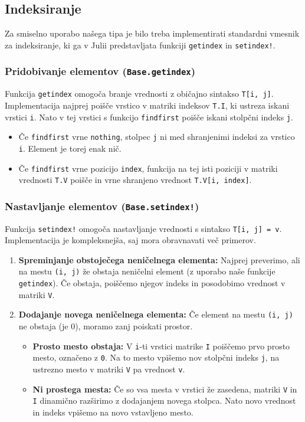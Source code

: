 \documentclass{article}
\begin{document}
\subsection{Indeksiranje}
Za smiselno uporabo našega tipa je bilo treba implementirati standardni 
vmesnik za indeksiranje, ki ga v Julii predstavljata funkciji \texttt{getindex} 
in \texttt{setindex!}.

\subsubsection{Pridobivanje elementov (\texttt{Base.getindex})}

Funkcija \texttt{getindex} omogoča branje vrednosti z običajno sintakso 
\texttt{T[i, j]}. Implementacija najprej poišče vrstico v matriki indeksov 
\texttt{T.I}, ki ustreza iskani vrstici \texttt{i}. Nato v tej vrstici s 
funkcijo \texttt{findfirst} poišče iskani stolpčni indeks \texttt{j}.

\begin{itemize}
    \item Če \texttt{findfirst} vrne \texttt{nothing}, stolpec \texttt{j} ni 
    med shranjenimi indeksi za vrstico \texttt{i}. Element je torej enak nič.
    \item Če \texttt{findfirst} vrne pozicijo \texttt{index}, funkcija na tej 
    isti poziciji v matriki vrednosti \texttt{T.V} poišče in vrne shranjeno 
    vrednost \texttt{T.V[i, index]}.
\end{itemize}

\subsubsection{Nastavljanje elementov (\texttt{Base.setindex!})}
Funkcija \texttt{setindex!} omogoča nastavljanje vrednosti s sintakso 
\texttt{T[i, j] = v}. Implementacija je kompleksnejša, saj mora obravnavati 
več primerov.

\begin{enumerate}
    \item \textbf{Spreminjanje obstoječega neničelnega elementa:} Najprej preverimo, ali na mestu \texttt{(i, j)} že obstaja neničelni element 
    (z uporabo naše funkcije \texttt{getindex}). Če obstaja, poiščemo 
    njegov indeks in posodobimo vrednost v matriki \texttt{V}.
    \item \textbf{Dodajanje novega neničelnega elementa:} Če element na 
    mestu \texttt{(i, j)} ne obstaja (je 0), moramo zanj poiskati prostor. 
    \begin{itemize}
        \item \textbf{Prosto mesto obstaja:} V \texttt{i}-ti vrstici matrike \texttt{I} poiščemo prvo prosto mesto, označeno z \texttt{0}. Na to mesto vpišemo nov stolpčni indeks \texttt{j}, na ustrezno mesto v matriki \texttt{V} pa vrednost \texttt{v}.
        \item \textbf{Ni prostega mesta:} Če so vsa mesta v vrstici že 
        zasedena, matriki \texttt{V} in \texttt{I} dinamično razširimo z 
        dodajanjem novega stolpca. Nato novo vrednost in indeks vpišemo na 
        novo vstavljeno mesto.
    \end{itemize}
\end{enumerate}
\end{document}
